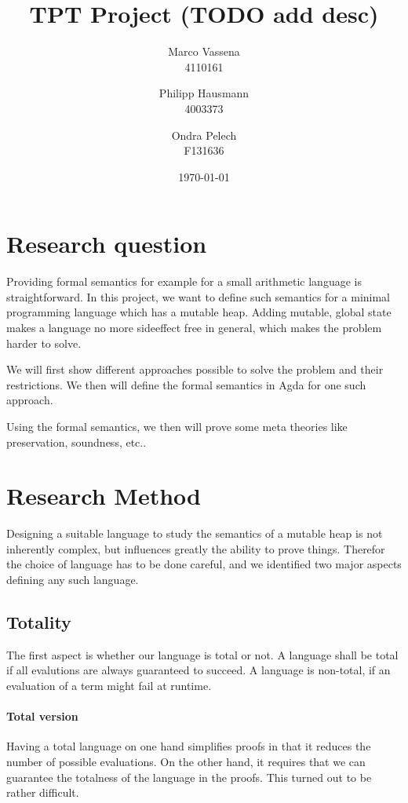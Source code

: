 \documentclass[12pt, a4paper, oneside]{article}
\title{TPT Project (TODO add desc)}
\author{Marco Vassena  \\
    4110161 \\
    \and
    Philipp Hausmann \\
    4003373 \\
    \and
    Ondra Pelech \\
    F131636 \\
    }
\date{\today}
\begin{document}
\maketitle

\tableofcontents


\section{Research question}
Providing formal semantics for example for a small arithmetic language is straightforward. In this project, we want to define such semantics
for a minimal programming language which has a mutable heap. Adding mutable, global state makes a language no more sideeffect free in
general, which makes the problem harder to solve.

We will first show different approaches possible to solve the problem and their restrictions. We then will define the formal
semantics in Agda for one such approach.


Using the formal semantics, we then will prove some meta theories like preservation, soundness, etc..




\section{Research Method}

Designing a suitable language to study the semantics of a mutable heap is not inherently complex, but influences greatly
the ability to prove things. Therefor the choice of language has to be done careful, and we identified two
major aspects defining any such language.

\subsection{Totality}
The first aspect is whether our language is total or not. A language shall be total if all evalutions
are always guaranteed to succeed. A language is non-total, if an evaluation of a term might fail
at runtime.

\paragraph{Total version}
Having a total language on one hand simplifies proofs in that it reduces the number of possible evaluations.
On the other hand, it requires that we can guarantee the totalness of the language in the proofs. This turned
out to be rather difficult.
\end{document}

